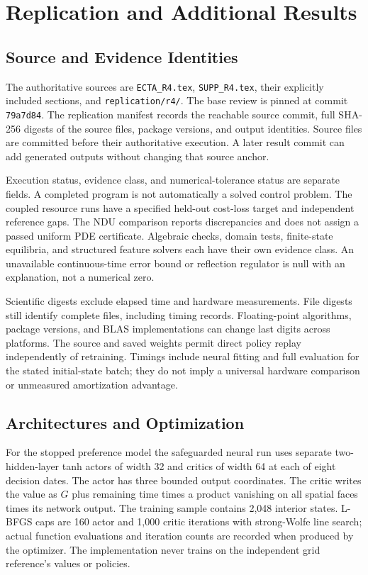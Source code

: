 \section{Replication and Additional Results}
\subsection{Source and Evidence Identities}
The authoritative sources are \texttt{ECTA\_R4.tex}, \texttt{SUPP\_R4.tex}, their explicitly included sections, and \texttt{replication/r4/}. The base review is pinned at commit \texttt{79a7d84}. The replication manifest records the reachable source commit, full SHA-256 digests of the source files, package versions, and output identities. Source files are committed before their authoritative execution. A later result commit can add generated outputs without changing that source anchor.

Execution status, evidence class, and numerical-tolerance status are separate fields. A completed program is not automatically a solved control problem. The coupled resource runs have a specified held-out cost-loss target and independent reference gaps. The NDU comparison reports discrepancies and does not assign a passed uniform PDE certificate. Algebraic checks, domain tests, finite-state equilibria, and structured feature solvers each have their own evidence class. An unavailable continuous-time error bound or reflection regulator is null with an explanation, not a numerical zero.

Scientific digests exclude elapsed time and hardware measurements. File digests still identify complete files, including timing records. Floating-point algorithms, package versions, and BLAS implementations can change last digits across platforms. The source and saved weights permit direct policy replay independently of retraining. Timings include neural fitting and full evaluation for the stated initial-state batch; they do not imply a universal hardware comparison or unmeasured amortization advantage.

\subsection{Architectures and Optimization}
For the stopped preference model the safeguarded neural run uses separate two-hidden-layer tanh actors of width 32 and critics of width 64 at each of eight decision dates. The actor has three bounded output coordinates. The critic writes the value as $G$ plus remaining time times a product vanishing on all spatial faces times its network output. The training sample contains 2,048 interior states. L-BFGS caps are 160 actor and 1,000 critic iterations with strong-Wolfe line search; actual function evaluations and iteration counts are recorded when produced by the optimizer. The implementation never trains on the independent grid reference's values or policies.

